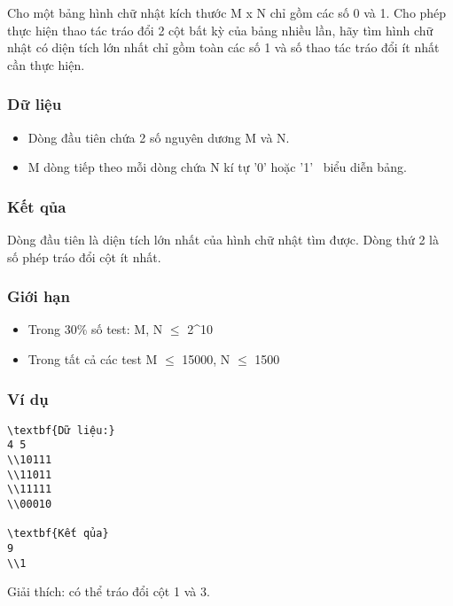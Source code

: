 



   Cho một bảng hình chữ nhật kích thước M x N chỉ gồm các số 0 và 1. Cho phép thực hiện thao tác tráo đổi 2 cột bất kỳ của bảng nhiều lần, hãy tìm hình chữ nhật có diện tích lớn nhất chỉ gồm toàn các số 1 và số thao tác tráo đổi ít nhất cần thực hiện.  

\subsubsection{   Dữ liệu  }
\begin{itemize}
	\item     Dòng đầu tiên chứa 2 số nguyên dương M và N.   
	\item     M dòng tiếp theo mỗi dòng chứa N kí tự '0' hoặc '1'  biểu diễn bảng.   
\end{itemize}

\subsubsection{   Kết qủa  }

   Dòng đầu tiên là diện tích lớn nhất của hình chữ nhật tìm được. Dòng thứ 2 là số phép tráo đổi cột ít nhất.  

\subsubsection{   Giới hạn  }
\begin{itemize}
	\item     Trong 30\% số test: M, N  $\le$  2\textasciicircum10   
	\item     Trong tất cả các test M  $\le$  15000, N  $\le$  1500   
\end{itemize}

\subsubsection{   Ví dụ  }
\begin{verbatim}
\textbf{Dữ liệu:}
4 5
\\10111
\\11011
\\11111
\\00010

\textbf{Kết qủa}
9
\\1
\end{verbatim}

   Giải thích: có thể tráo đổi cột 1 và 3.  

